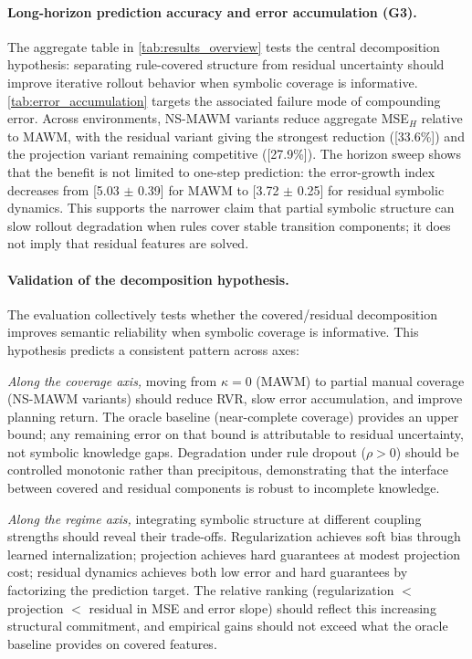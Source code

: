 \documentclass{article}
\theoremstyle{plain}
\theoremstyle{definition}
\theoremstyle{remark}
\begin{document}
\paragraph{Long-horizon prediction accuracy and error accumulation (G3).}
The aggregate table in \autoref{tab:results_overview} tests the central decomposition hypothesis: separating rule-covered structure from residual uncertainty should improve iterative rollout behavior when symbolic coverage is informative. \autoref{tab:error_accumulation} targets the associated failure mode of compounding error. Across environments, NS-MAWM variants reduce aggregate MSE$_H$ relative to MAWM, with the residual variant giving the strongest reduction ([33.6\%]) and the projection variant remaining competitive ([27.9\%]). The horizon sweep shows that the benefit is not limited to one-step prediction: the error-growth index decreases from [5.03 $\pm$ 0.39] for MAWM to [3.72 $\pm$ 0.25] for residual symbolic dynamics. This supports the narrower claim that partial symbolic structure can slow rollout degradation when rules cover stable transition components; it does not imply that residual features are solved.

\paragraph{Validation of the decomposition hypothesis.}
The evaluation collectively tests whether the covered/residual decomposition improves semantic reliability when symbolic coverage is informative. This hypothesis predicts a consistent pattern across axes:

\emph{Along the coverage axis,} moving from $\kappa=0$ (MAWM) to partial manual coverage (NS-MAWM variants) should reduce RVR, slow error accumulation, and improve planning return. The oracle baseline (near-complete coverage) provides an upper bound; any remaining error on that bound is attributable to residual uncertainty, not symbolic knowledge gaps. Degradation under rule dropout ($\rho > 0$) should be controlled monotonic rather than precipitous, demonstrating that the interface between covered and residual components is robust to incomplete knowledge.

\emph{Along the regime axis,} integrating symbolic structure at different coupling strengths should reveal their trade-offs. Regularization achieves soft bias through learned internalization; projection achieves hard guarantees at modest projection cost; residual dynamics achieves both low error and hard guarantees by factorizing the prediction target. The relative ranking (regularization $<$ projection $<$ residual in MSE and error slope) should reflect this increasing structural commitment, and empirical gains should not exceed what the oracle baseline provides on covered features.
\end{document}
